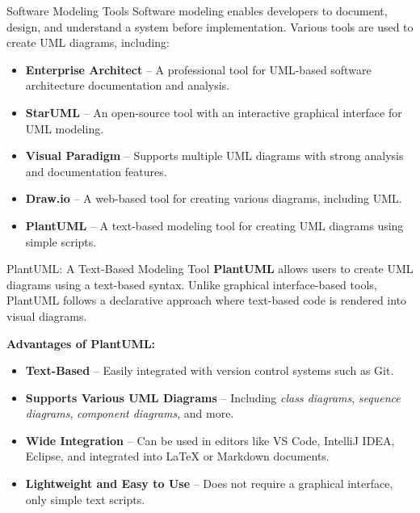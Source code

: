 \documentclass[aspectratio=169, table]{beamer}
\begin{document}
\begin{frame}{Software Modeling Tools}
	\vspace{20pt}
	Software modeling enables developers to document, design, and understand a system before implementation. Various tools are used to create UML diagrams, including:
	\begin{itemize}
		\item \textbf{Enterprise Architect} – A professional tool for UML-based software architecture documentation and analysis.
		\item \textbf{StarUML} – An open-source tool with an interactive graphical interface for UML modeling.
		\item \textbf{Visual Paradigm} – Supports multiple UML diagrams with strong analysis and documentation features.
		\item \textbf{Draw.io} – A web-based tool for creating various diagrams, including UML.
		\item \textbf{PlantUML} – A text-based modeling tool for creating UML diagrams using simple scripts.
	\end{itemize}
\end{frame}

\begin{frame}{PlantUML: A Text-Based Modeling Tool}
	\vspace{20pt}
	\textbf{PlantUML} allows users to create UML diagrams using a text-based syntax. Unlike graphical interface-based tools, PlantUML follows a declarative approach where text-based code is rendered into visual diagrams.
	
	\textbf{Advantages of PlantUML:}
	\begin{itemize}
		\item \textbf{Text-Based} – Easily integrated with version control systems such as Git.
		\item \textbf{Supports Various UML Diagrams} – Including \textit{class diagrams}, \textit{sequence diagrams}, \textit{component diagrams}, and more.
		\item \textbf{Wide Integration} – Can be used in editors like VS Code, IntelliJ IDEA, Eclipse, and integrated into LaTeX or Markdown documents.
		\item \textbf{Lightweight and Easy to Use} – Does not require a graphical interface, only simple text scripts.
	\end{itemize}
\end{frame}
\end{document}
